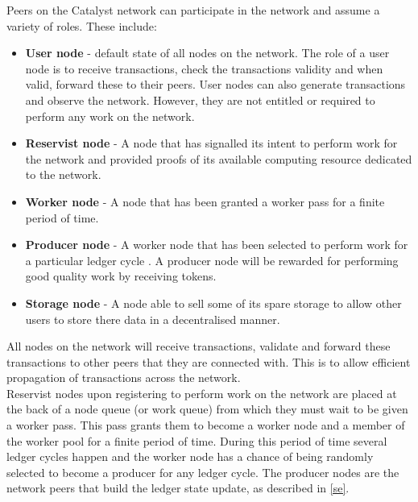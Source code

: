 Peers on the Catalyst network can participate in the network and assume a variety of roles. These include:

\begin{itemize}

\item \textbf{User node} - default state of all nodes on the network. The role of a user node is to receive transactions, check the transactions validity and when valid, forward these to their peers. User nodes can also generate transactions and observe the network. However, they are not entitled or required to perform any work on the network. 

\item \textbf{Reservist node} - A node that has signalled  its intent to perform work for the network and provided proofs of its available computing resource dedicated to the network.

\item \textbf{Worker node} - A node that has been granted a worker pass for a finite period of time. 

\item \textbf{Producer node} - A worker node that has been selected to perform work for a particular ledger cycle . A producer node will be rewarded for performing good quality work by receiving tokens. 

\item \textbf{Storage node} - A node able to sell some of its spare storage to allow other users to store there data in a decentralised manner. 

\end{itemize}

All nodes on the network will receive transactions, validate and forward these transactions to other peers that they are connected with. This is to allow efficient propagation of transactions across the network. \\

Reservist nodes upon registering to perform work on the network are placed at the back of a node queue (or work queue) from which they must wait to be given a worker pass. This pass grants them to become a worker node and a member of the worker pool for a finite period of time. During this period of time several ledger cycles happen and the worker node has a chance of being randomly selected to become a producer for any ledger cycle. The producer nodes are the network peers that build the ledger state update, as described in \ref{se}. 